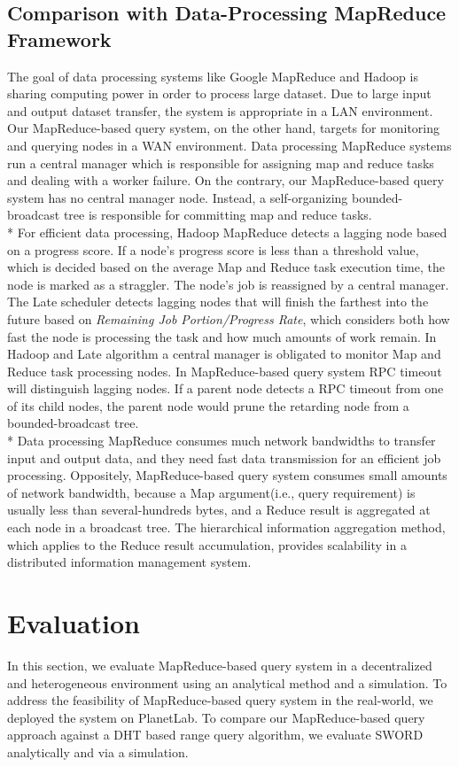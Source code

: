 \documentclass{acm_proc_article-sp}
\begin{document}
\subsection{Comparison with Data-Processing MapReduce Framework}
The goal of data processing systems like Google MapReduce\cite{google_mapreduce} and Hadoop\cite{hadoop} is sharing computing power in order to process large dataset. 
Due to large input and output dataset transfer, the system is appropriate in a LAN environment.
Our MapReduce-based query system, on the other hand, targets for monitoring and querying nodes in a WAN environment.
Data processing MapReduce systems run a central manager which is responsible for assigning map and reduce tasks and dealing with a  worker failure.
On the contrary, our MapReduce-based query system has no central manager node. Instead, a self-organizing bounded-broadcast tree is responsible for committing map and reduce tasks.\\*
For efficient data processing, Hadoop MapReduce detects a lagging node based on a progress score.
If a node's progress score is less than a threshold value, which is decided based on the average Map and Reduce task execution time, the node is marked as a straggler. The node's job is reassigned by a central manager.
The Late scheduler\cite{late} detects lagging nodes that will finish the farthest into the future based on \textit{Remaining Job Portion/Progress Rate}, which considers both
how fast the node is processing the task and how much amounts of work remain. 
In Hadoop and Late algorithm a central manager is obligated to monitor Map and Reduce task processing nodes. 
In MapReduce-based query system RPC timeout will distinguish lagging nodes. If a parent node detects a RPC timeout from one of its child nodes, the parent node would prune the retarding node from a bounded-broadcast tree.\\*
Data processing MapReduce consumes much network bandwidths to transfer input and output data, and they need fast data transmission for an efficient job processing. 
Oppositely, MapReduce-based query system consumes small amounts of network bandwidth, because a Map argument(i.e., query requirement) is usually less than several-hundreds bytes, and a Reduce result is aggregated at each node in a broadcast tree.
The hierarchical information aggregation method, which applies to the Reduce result accumulation, provides scalability in a distributed information management system\cite{astrobe}\cite{treedatamanage}.
\section{Evaluation}
In this section, we evaluate MapReduce-based query system in a decentralized and heterogeneous environment using an analytical method and a simulation. 
To address the feasibility of MapReduce-based query system in the real-world, we deployed the system on PlanetLab. 
To compare our MapReduce-based query approach against a DHT based range query algorithm, we evaluate SWORD\cite{sword} analytically and via a simulation.
\end{document}
